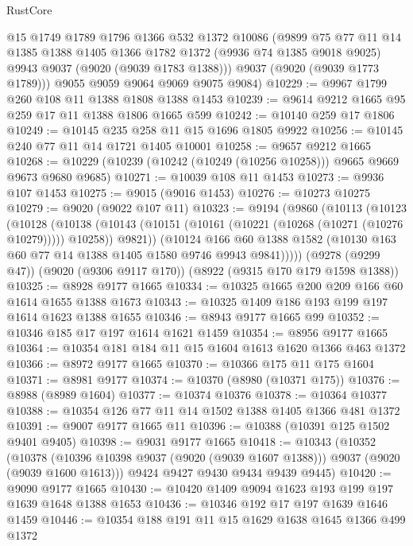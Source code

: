 \begin{lexlean}{RustCore}
\begin{coremodule}
        @15
        @1749
        @1789
        @1796
        @1366
        @532
        @1372
        @10086
        (@9899
          @75
          @77
          @11
          @14
          @1385
          @1388
          @1405
          @1366
          @1782
          @1372
          (@9936 @74 @1385 @9018 @9025)
          @9943
          @9037
          (@9020 (@9039 @1783 @1388)))
        @9037
        (@9020 (@9039 @1773 @1789)))
      @9055
      @9059
      @9064
      @9069
      @9075
      @9084)
@10229 := @9967 @1799 @260 @108 @11 @1388 @1808 @1388 @1453
@10239 := @9614 @9212 @1665 @95 @259 @17 @11 @1388 @1806 @1665 @599
@10242 := @10140 @259 @17 @1806
@10249 := @10145 @235 @258 @11 @15 @1696 @1805 @9922
@10256 := @10145 @240 @77 @11 @14 @1721 @1405 @10001
@10258 := @9657 @9212 @1665
@10268 := @10229 (@10239 (@10242 (@10249 (@10256 @10258))) @9665 @9669 @9673 @9680 @9685)
@10271 := @10039 @108 @11 @1453
@10273 := @9936 @107 @1453
@10275 := @9015 (@9016 @1453)
@10276 := @10273 @10275
@10279 := @9020 (@9022 @107 @11)
@10323 := @9194
    (@9860
      (@10113
        (@10123
          (@10128
            (@10138
              (@10143 (@10151 (@10161 (@10221 (@10268 (@10271 (@10276 @10279))))) @10258))
              @9821))
          (@10124
            @166
            @60
            @1388
            @1582
            (@10130 @163 @60 @77 @14 @1388 @1405 @1580 @9746 @9943 @9841)))))
    (@9278 (@9299 @47))
    (@9020 (@9306 @9117 @170))
    (@8922 (@9315 @170 @179 @1598 @1388))
@10325 := @8928 @9177 @1665
@10334 := @10325 @1665 @200 @209 @166 @60 @1614 @1655 @1388 @1673
@10343 := @10325 @1409 @186 @193 @199 @197 @1614 @1623 @1388 @1655
@10346 := @8943 @9177 @1665 @99
@10352 := @10346 @185 @17 @197 @1614 @1621 @1459
@10354 := @8956 @9177 @1665
@10364 := @10354 @181 @184 @11 @15 @1604 @1613 @1620 @1366 @463 @1372
@10366 := @8972 @9177 @1665
@10370 := @10366 @175 @11 @175 @1604
@10371 := @8981 @9177
@10374 := @10370 (@8980 (@10371 @175))
@10376 := @8988 (@8989 @1604)
@10377 := @10374 @10376
@10378 := @10364 @10377
@10388 := @10354 @126 @77 @11 @14 @1502 @1388 @1405 @1366 @481 @1372
@10391 := @9007 @9177 @1665 @11
@10396 := @10388 (@10391 @125 @1502 @9401 @9405)
@10398 := @9031 @9177 @1665
@10418 := @10343
    (@10352
      (@10378 (@10396 @10398 @9037 (@9020 (@9039 @1607 @1388))) @9037 (@9020 (@9039 @1600 @1613)))
      @9424
      @9427
      @9430
      @9434
      @9439
      @9445)
@10420 := @9090 @9177 @1665
@10430 := @10420 @1409 @9094 @1623 @193 @199 @197 @1639 @1648 @1388 @1653
@10436 := @10346 @192 @17 @197 @1639 @1646 @1459
@10446 := @10354 @188 @191 @11 @15 @1629 @1638 @1645 @1366 @499 @1372

\end{coremodule}
\end{lexlean}
